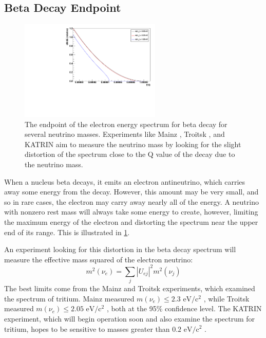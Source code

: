 \documentclass[herrin-thesis.tex]{subfiles}
\begin{document}
\subsection{Beta Decay Endpoint}
\begin{figure}[htp]
	\centering
	\includegraphics[width=0.6\textwidth]{./plots/nu_beta_endpt.pdf}
	\caption[Beta decay spectrum endpoint for massive neutrinos]{The endpoint of the electron energy spectrum for beta decay for several neutrino masses. Experiments like Mainz \cite{Kraus:2005nx}, Troitsk \cite{Aseev:2011dq}, and KATRIN \cite{Osipowicz:2001oq} aim to measure the neutrino mass by looking for the slight distortion of the spectrum close to the Q value of the decay due to the neutrino mass.}
	\label{fig:nu_beta_endpt}
\end{figure}

When a nucleus beta decays, it emits an electron antineutrino, which carries away some energy from the decay. However, this amount may be very small, and so in rare cases, the electron may carry away nearly all of the energy. A neutrino with nonzero rest mass will always take some energy to create, however, limiting the maximum energy of the electron and distorting the spectrum near the upper end of its range. This is illustrated in \cref{fig:nu_beta_endpt}.

An experiment looking for this distortion in the beta decay spectrum will measure the effective mass squared of the electron neutrino:
\begin{equation}
m^2\left(\nu_e\right) = \sum_j \left | U_{e j} \right |^2 m^2\left(\nu_j\right)
\label{eq:nu_beta_endpt_mass}
\end{equation}
The best limits come from the Mainz and Troitsk experiments, which examined the spectrum of tritium. Mainz measured \(m(\nu_e) \leq 2.3 \text{ eV}/\text{c}^{2}\) \cite{Kraus:2005nx}, while Troitsk measured \(m(\nu_e) \leq 2.05 \text{ eV}/\text{c}^{2}\) \cite{Aseev:2011dq}, both at the 95\% confidence level. The KATRIN experiment, which will begin operation soon and also examine the spectrum for tritium, hopes to be sensitive to masses greater than \(0.2\text{ eV}/\text{c}^2\) \cite{Osipowicz:2001oq}.
\end{document}
